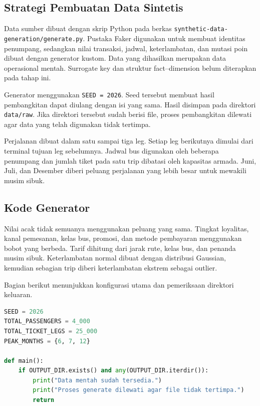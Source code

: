 \subsection{Strategi Pembuatan Data Sintetis}

Data sumber dibuat dengan skrip Python pada berkas
\texttt{synthetic-data-generation/generate.py}. Pustaka Faker digunakan untuk
membuat identitas penumpang, sedangkan nilai transaksi, jadwal, keterlambatan,
dan mutasi poin dibuat dengan generator kustom. Data yang dihasilkan merupakan
data operasional mentah. Surrogate key dan struktur fact--dimension belum
diterapkan pada tahap ini.

Generator menggunakan \texttt{SEED = 2026}. Seed tersebut membuat hasil
pembangkitan dapat diulang dengan isi yang sama. Hasil disimpan pada direktori
\texttt{data/raw}. Jika direktori tersebut sudah berisi file, proses pembangkitan
dilewati agar data yang telah digunakan tidak tertimpa.

Perjalanan dibuat dalam satu sampai tiga leg. Setiap leg berikutnya dimulai dari
terminal tujuan leg sebelumnya. Jadwal bus digunakan oleh beberapa penumpang dan
jumlah tiket pada satu trip dibatasi oleh kapasitas armada. Juni, Juli, dan
Desember diberi peluang perjalanan yang lebih besar untuk mewakili musim sibuk.

\subsection{Kode Generator}

Nilai acak tidak semuanya menggunakan peluang yang sama. Tingkat loyalitas,
kanal pemesanan, kelas bus, promosi, dan metode pembayaran menggunakan bobot yang
berbeda. Tarif dihitung dari jarak rute, kelas bus, dan penanda musim sibuk.
Keterlambatan normal dibuat dengan distribusi Gaussian, kemudian sebagian trip
diberi keterlambatan ekstrem sebagai outlier.

Bagian berikut menunjukkan konfigurasi utama dan pemeriksaan direktori keluaran.

\begin{lstlisting}[language=Python]
SEED = 2026
TOTAL_PASSENGERS = 4_000
TOTAL_TICKET_LEGS = 25_000
PEAK_MONTHS = {6, 7, 12}

def main():
    if OUTPUT_DIR.exists() and any(OUTPUT_DIR.iterdir()):
        print("Data mentah sudah tersedia.")
        print("Proses generate dilewati agar file tidak tertimpa.")
        return
\end{lstlisting}

